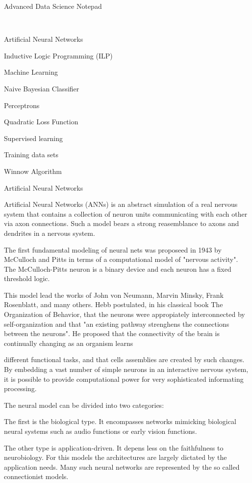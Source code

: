 
Advanced Data Science Notepad

 


Artificial Neural Networks

Inductive Logic Programming (ILP)

Machine Learning

Naive Bayesian Classifier

Perceptrons

Quadratic Loss Function

Supervised learning

Training data sets

Winnow Algorithm


Artificial Neural Networks 

Artificial Neural Networks (ANNs) is an abstract simulation of a real nervous system that contains a collection of neuron units communicating with each other via axon connections. Such a model bears a strong reasemblance to axons and dendrites in a nervous system.


The first fundamental modeling of neural nets was proposeed in 1943 by McCulloch and Pitts in terms of a computational model of "nervous activity". The McCulloch-Pitts neuron is a binary device and each neuron has a fixed threshold logic. 


This model lead the works of John von Neumann, Marvin Minsky, Frank Rosenblatt, and many others. Hebb postulated, in his classical book The Organization of Behavior, that the neurons were appropiately interconnected by self-organization and that "an existing pathway strenghens the connections between the neurons". He proposed that the connectivity of the brain is continually changing as an organism learns 

different functional tasks, and that cells assemblies are created by such changes. By embedding a vast number of simple neurons in an interactive nervous system, it is possible to provide computational power  for very sophisticated informating processing. 


The neural model can be divided into two categories:


The first is the biological type. It encompasses networks mimicking biological neural systems such as audio functions or early vision functions.

The other type is application-driven. It depens less on the faithfulness to neurobiology. For this models the architectures are largely dictated by the application needs. Many such neural networks are represented by the so called connectionist models.

